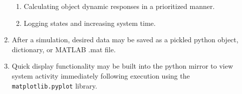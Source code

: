 \documentclass[12pt]{article}
\begin{document}
\begin{enumerate}
\begin{enumerate}
		\item Calculating object dynamic responses in a prioritized manner.
		\item Logging states and increasing system time.
	\end{enumerate}
\item After a simulation, desired data may be saved as a pickled python object, dictionary, or MATLAB .mat file.
\item Quick display functionality may be built into the python mirror to view system activity immediately following execution using the \verb|matplotlib.pyplot| library.
\end{enumerate}

\pagebreak
\end{document}
